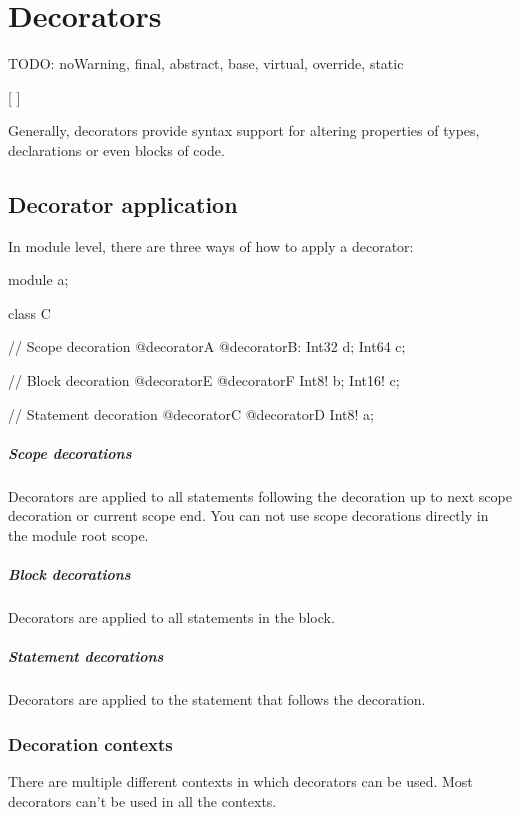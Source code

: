 \chapter{Decorators}
TODO: noWarning, final, abstract, base, virtual, override, static

\begin{grammar}
	   [  ]
\end{grammar}

Generally, decorators provide syntax support for altering properties of types, declarations or even blocks of code.

\section{Decorator application}
In module level, there are three ways of how to apply a decorator:
\begin{code}
module a;

class C {
	
// Scope decoration
@decoratorA @decoratorB:
	Int32 d;
	Int64 c;
	
	// Block decoration
	@decoratorE @decoratorF {
		Int8! b;
		Int16! c;	
	}
	
	// Statement decoration
	@decoratorC @decoratorD Int8! a;
				
}
\end{code}

\paragraph{Scope decorations} Decorators are applied to all statements following the decoration up to next scope decoration or current scope end. You can not use scope decorations directly in the module root scope.

\paragraph{Block decorations} Decorators are applied to all statements in the block.

\paragraph{Statement decorations} Decorators are applied to the statement that follows the decoration.

\subsection{Decoration contexts} \label{decorationContexts}
There are multiple different contexts in which decorators can be used. Most decorators can't be used in all the contexts.

